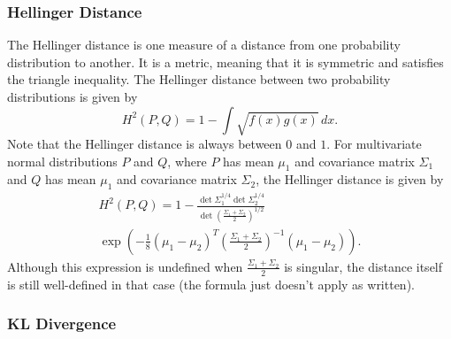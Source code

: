 \documentclass{article}
\newcommand*{\Pn}[1]{\left( #1 \right)}
\begin{document}
\subsubsection{Hellinger Distance}

The Hellinger distance is one measure of a distance from one probability distribution to another.\cite{wikihell} It is a metric, meaning that it is symmetric and satisfies the triangle inequality. The Hellinger distance between two probability distributions is given by
\[
    H^2(P,Q)=1-\int \sqrt{f(x)g(x)}\,dx.
\]
Note that the Hellinger distance is always between $0$ and $1$. For multivariate normal distributions $P$ and $Q$, where $P$ has mean $\mu_1$ and covariance matrix $\Sigma_1$ and $Q$ has mean $\mu_1$ and covariance matrix $\Sigma_2$, the Hellinger distance is given by \cite{pardo}
\begin{multline*}
    H^2(P,Q)=1-\frac{\det\Sigma_1^{1/4}\det\Sigma_2^{1/4}}
    {\det\Pn{\frac{\Sigma_1+\Sigma_2}{2}}^{1/2}}\\
    \exp\Pn{-\frac18(\mu_1-\mu_2)^T\Pn{\frac{\Sigma_1+\Sigma_2}{2}}^{-1}
    (\mu_1-\mu_2)}.
\end{multline*}
Although this expression is undefined when $\frac{\Sigma_1+\Sigma_2}{2}$ is singular, the distance itself is still well-defined in that case (the formula just doesn't apply as written).

\subsubsection{KL Divergence}
\end{document}
